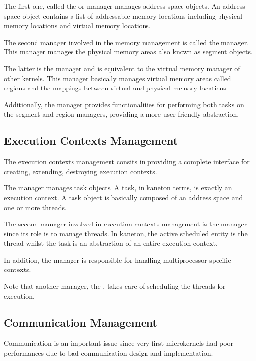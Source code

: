 The first one, called the  or  manager
manages address space objects. An address space object contains a list of
addressable memory locations including physical memory locations and virtual
memory locations.

The second manager involved in the memory management is called the
 manager. This manager manages the physical memory areas
also known as segment objects.

The latter is the  manager and is equivalent to the
virtual memory manager of other kernels. This manager basically manages
virtual memory areas called regions and the mappings between virtual and
physical memory locations.

Additionally, the  manager provides functionalities for performing
both tasks on the segment and region managers, providing a more user-friendly
abstraction.


\subsection*{Execution Contexts Management}

The execution contexts management consits in providing a complete interface
for creating, extending, destroying \etc{} execution contexts.

The  manager manages task objects. A task, in kaneton terms, is
exactly an execution context. A task object is basically composed of an
address space and one or more threads.

The second manager involved in execution contexts management is the
 manager since its role is to manage threads. In kaneton, the
active scheduled entity is the thread whilst the task is an abstraction of an
entire execution context.

In addition, the  manager is responsible for handling
multiprocessor-specific contexts.

Note that another manager, the , takes care of scheduling
the threads for execution.


\subsection*{Communication Management}

Communication is an important issue since very first microkernels had poor
performances due to bad communication design and implementation.

